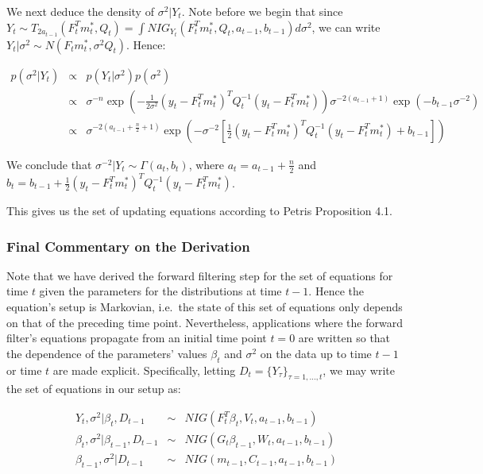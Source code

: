 \documentclass[
]{book}
\theoremstyle{definition}
\theoremstyle{definition}
\theoremstyle{definition}
\theoremstyle{definition}
\theoremstyle{remark}
\begin{document}
We next deduce the density of \(\sigma^{2}\vert Y_{t}\). Note before we begin that since \(Y_{t} \sim T_{2a_{t-1}}(F_{t}^{T}m^{*}_{t}, Q_{t}) = \int NIG_{Y_{t}}(F_{t}^{T}m^{*}_{t}, Q_{t}, a_{t-1}, b_{t-1})d\sigma^{2}\), we can write \(Y_{t}\vert \sigma^{2} \sim N(F_{t}m^{*}_{t}, \sigma^{2}Q_{t})\). Hence:

\begin{eqnarray*}
p(\sigma^{2}\vert Y_{t}) &\propto& p(Y_{t}\vert \sigma^{2})p(\sigma^{2})\\
 &\propto& \sigma^{-n}\exp(-\frac{1}{2\sigma^{2}}(y_{t} - F_{t}^{T}m^{*}_{t})^{T}Q_{t}^{-1}(y_{t} - F_{t}^{T}m^{*}_{t}))\sigma^{-2(a_{t-1} + 1)}\exp(-b_{t-1}\sigma^{-2})\\
 &\propto& \sigma^{-2(a_{t-1} + \frac{n}{2} + 1)}\exp(-\sigma^{-2}[\frac{1}{2}(y_{t} - F_{t}^{T}m^{*}_{t})^{T}Q_{t}^{-1}(y_{t} - F_{t}^{T}m^{*}_{t}) + b_{t-1}])
\end{eqnarray*}

We conclude that \(\sigma^{-2}\vert Y_{t} \sim \Gamma(a_{t},b_{t})\), where \(a_{t} = a_{t-1} + \frac{n}{2}\) and \(b_{t} = b_{t-1} + \frac{1}{2}(y_{t} - F_{t}^{T}m^{*}_{t})^{T}Q_{t}^{-1}(y_{t} - F_{t}^{T}m^{*}_{t})\).

This gives us the set of updating equations according to Petris Proposition 4.1.

\hypertarget{final-commentary-on-the-derivation}{%
\subsubsection{Final Commentary on the Derivation}\label{final-commentary-on-the-derivation}}

Note that we have derived the forward filtering step for the set of equations for time \(t\) given the parameters for the distributions at time \(t-1\). Hence the equation's setup is Markovian, i.e.~the state of this set of equations only depends on that of the preceding time point. Nevertheless, applications where the forward filter's equations propagate from an initial time point \(t=0\) are written so that the dependence of the parameters' values \(\beta_{t}\) and \(\sigma^{2}\) on the data up to time \(t-1\) or time \(t\) are made explicit. Specifically, letting \(D_{t} = \{Y_{\tau}\}_{\tau=1,\ldots,t}\), we may write the set of equations in our setup as:

\begin{eqnarray*}
Y_{t},\sigma^{2}\vert \beta_{t},D_{t-1} &\sim& NIG(F_{t}^{T}\beta_{t}, V_{t}, a_{t-1}, b_{t-1})\\
\beta_{t},\sigma^{2}\vert \beta_{t-1},D_{t-1} &\sim& NIG(G_{t}\beta_{t-1}, W_{t}, a_{t-1}, b_{t-1})\\
\beta_{t-1},\sigma^{2}\vert D_{t-1} &\sim& NIG(m_{t-1}, C_{t-1}, a_{t-1}, b_{t-1})
\end{eqnarray*}
\end{document}
